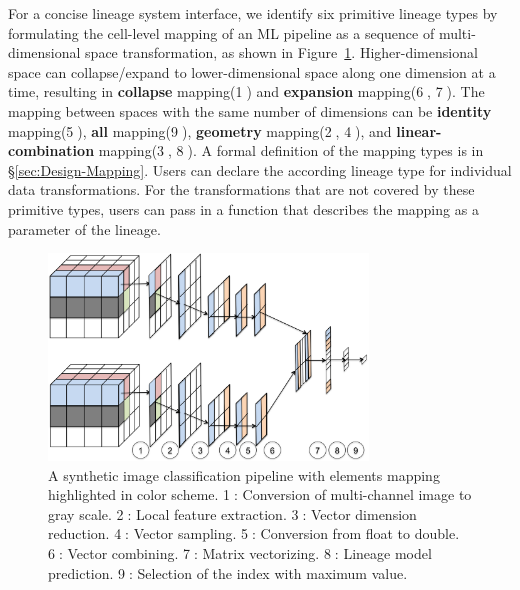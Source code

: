 \documentclass{sig-alternate}
\begin{document}
For a concise lineage system interface, we identify six primitive lineage types by formulating the cell-level mapping 
of an ML pipeline as a sequence of multi-dimensional space transformation, as shown in Figure~\ref{fig:conceptual}.
Higher-dimensional space can collapse/expand to lower-dimensional space along one dimension at a time, 
resulting in {\bf collapse} mapping(\textcircled{1}) and {\bf expansion} mapping(\textcircled{6}, \textcircled{7}). 
The mapping between spaces with the same number of dimensions can be {\bf identity} mapping(\textcircled{5}), {\bf all} mapping(\textcircled{9}), 
{\bf geometry} mapping(\textcircled{2}, \textcircled{4}), and {\bf linear-combination} mapping(\textcircled{3}, \textcircled{8}).
A formal definition of the mapping types is in \S\ref{sec:Design-Mapping}.
Users can declare the according lineage type for individual data transformations.
For the transformations that are not covered by these primitive types, users can pass in a function that describes the
mapping as a parameter of the lineage.

\begin{figure}[h]
\begin{center}
    \includegraphics[width=85mm]{pictures/Conceptual}
    \caption {A synthetic image classification pipeline with elements mapping highlighted in color scheme. 
    \textcircled{1}: Conversion of multi-channel image to gray scale.
    \textcircled{2}: Local feature extraction.
    \textcircled{3}: Vector dimension reduction.
    \textcircled{4}: Vector sampling.
    \textcircled{5}: Conversion from float to double.
    \textcircled{6}: Vector combining.
    \textcircled{7}: Matrix vectorizing.
    \textcircled{8}: Lineage model prediction.
    \textcircled{9}: Selection of the index with maximum value.
    \label{fig:conceptual}
}
\end{center}
\end{figure}
\end{document}
